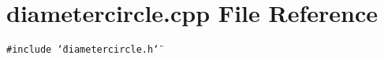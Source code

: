\section{diametercircle.cpp File Reference}
\label{diametercircle_8cpp}
{\tt \#include \char`\"{}diametercircle.h\char`\"{}}\par
